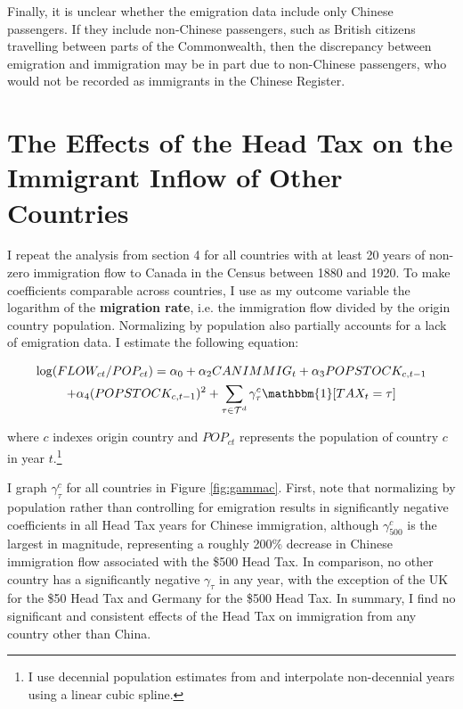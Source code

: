 Finally, it is unclear whether the emigration data include only Chinese passengers. If they include non-Chinese passengers, such as British citizens travelling between parts of the Commonwealth, then the discrepancy between emigration and immigration may be in part due to non-Chinese passengers, who would not be recorded as immigrants in the Chinese Register.

\newpage 

\section{The Effects of the Head Tax on the Immigrant Inflow of Other Countries}

I repeat the analysis from section 4 for all countries with at least 20 years of non-zero immigration flow to Canada in the Census between 1880 and 1920. To make coefficients comparable across countries, I use as my outcome variable the logarithm of the \textbf{migration rate}, i.e. the immigration flow divided by the origin country population. Normalizing by population also partially accounts for a lack of emigration data. I estimate the following equation:

\begin{multline}
    \label{eq:immflow3}
    \log(FLOW_{ct}/POP_{ct}) = \alpha_0 + \alpha_2 CANIMMIG_t + \alpha_3 POPSTOCK_{c, t-1} \\ + \alpha_4 (POPSTOCK_{c, t-1})^2 + \sum_{\tau \in \mathcal{T}^d} \gamma^c_\tau \mathbbm{1}[TAX_t = \tau]
\end{multline}

where $c$ indexes origin country and $POP_{ct}$ represents the population of country $c$ in year $t$.\footnote{I use decennial population estimates from \citet{maddison2010} and interpolate non-decennial years using a linear cubic spline.}

I graph $\gamma^c_{\tau}$ for all countries in Figure \ref{fig:gammac}. First, note that normalizing by population rather than controlling for emigration results in significantly negative coefficients in all Head Tax years for Chinese immigration, although $\gamma_{500}^c$ is the largest in magnitude, representing a roughly 200\% decrease in Chinese immigration flow associated with the \$500 Head Tax. In comparison, no other country has a significantly negative $\gamma_{\tau}$ in any year, with the exception of the UK for the \$50 Head Tax and Germany for the \$500 Head Tax. In summary, I find no significant and consistent effects of the Head Tax on immigration from any country other than China.

